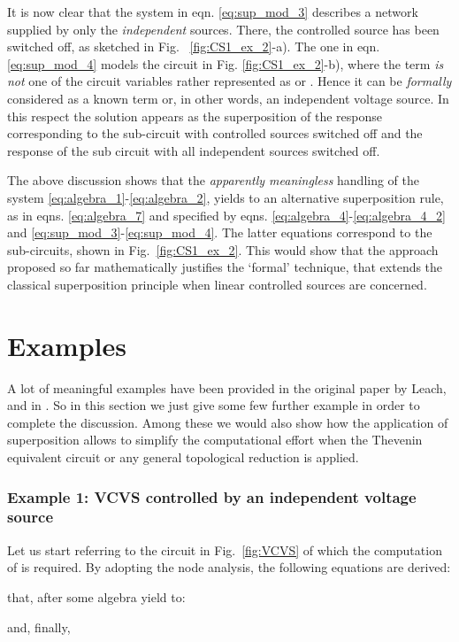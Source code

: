 \documentclass[10pt]{amsart}
\begin{document}
It is now clear that the system in eqn. \eqref{eq:sup_mod_3} describes a network supplied by only the \emph{independent} sources. There, the controlled source has been switched off, as sketched in Fig.~ \ref{fig:CS1_ex_2}-a). The one in eqn. \eqref{eq:sup_mod_4} models the circuit in Fig. \ref{fig:CS1_ex_2}-b), where the term  \emph{is not} one of the circuit variables rather represented as  or . Hence it can be \emph{formally} considered as a known term or, in other words, an independent voltage source. In this respect the solution appears as the superposition of the response corresponding to the sub-circuit with controlled sources switched off and the response of the sub circuit with all independent sources switched off.

The above discussion shows that the \emph{apparently meaningless} handling of the system \eqref{eq:algebra_1}-\eqref{eq:algebra_2}, yields to an alternative superposition rule, as in eqns. \eqref{eq:algebra_7} and specified by eqns. \eqref{eq:algebra_4}-\eqref{eq:algebra_4_2} and \eqref{eq:sup_mod_3}-\eqref{eq:sup_mod_4}.  The latter equations correspond to the sub-circuits, shown in Fig.~\ref{fig:CS1_ex_2}. This would  show that the approach proposed so far mathematically justifies the `formal' technique, that extends the classical superposition principle when linear controlled sources are concerned.

\section{Examples}
A lot of meaningful examples have been provided in the original paper by Leach, \cite{M-L-94} and in \cite{Damper_11,Rathore_12} . So in this section we just give some few further example in order to complete the discussion. Among these we would also show how the application of superposition allows to simplify the computational effort when the Thevenin equivalent circuit or any general topological reduction is applied. \\
\subsubsection*{Example 1: VCVS controlled by an independent voltage source}
Let us start referring to the circuit in Fig.~\ref{fig:VCVS} of which the computation of  is required. By adopting the node analysis, the following equations are derived:

that, after some algebra yield to:


and, finally,
\end{document}
